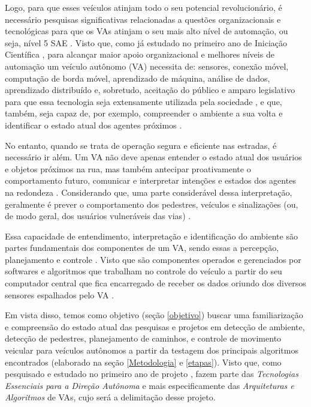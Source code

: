 \documentclass{article}
\begin{document}
Logo, para que esses veículos atinjam todo o seu potencial revolucionário, é necessário pesquisas significativas relacionadas a questões organizacionais e tecnológicas para que os VAs atinjam o seu mais alto nível de automação, ou seja, nível 5 SAE \cite{SAE}. Visto que, como já estudado no primeiro ano de Iniciação Científica \cite{my-work-on-git}, para alcançar maior apoio organizacional e melhores níveis de automação um veículo autônomo (VA) necessita de: sensores, conexão móvel, computação de borda móvel, aprendizado de máquina, análise de dados, aprendizado distribuído e, sobretudo, aceitação do público e amparo legislativo para que essa tecnologia seja extensamente utilizada pela sociedade \cite{KPMG}, e que, também, seja capaz de, por exemplo, compreender o ambiente a sua volta e identificar o estado atual dos agentes próximos \cite{sensors-yet}.

No entanto, quando se trata de operação segura e eficiente nas estradas, é necessário ir além. Um VA não deve apenas entender o estado atual dos usuários e objetos próximos na rua, mas também antecipar proativamente o comportamento futuro, comunicar e interpretar intenções e estados dos agentes na redondeza \cite{conge}. Considerando que, uma parte considerável dessa interpretação, geralmente é prever o comportamento dos pedestres, veículos e sinalizações (ou, de modo geral, dos usuários vulneráveis das vias) \cite{software-review}.

Essa capacidade de entendimento, interpretação e identificação do ambiente são partes fundamentais dos componentes de um VA, sendo essas a percepção, planejamento e controle \cite[p. ~37]{my-work-on-git}. Visto que são componentes operados e gerenciados por softwares e algoritmos que trabalham no controle do veículo a partir do seu computador central que fica encarregado de receber os dados oriundo dos diversos sensores espalhados pelo VA \cite[p. ~39]{my-work-on-git}.

    
    Em vista disso, temos como objetivo (seção \ref{objetivo}) buscar uma familiarização e compreensão do estado atual das pesquisas e projetos em detecção de ambiente, detecção de pedestres, planejamento de caminhos, e controle de movimento veicular para veículos autônomos a partir da testagem dos principais algoritmos encontrados (elaborado na seção \ref{Metodologia} e \ref{etapas}). Visto que, como pesquisado e estudado no primeiro ano de projeto \cite{my-work-on-git}, fazem parte das \textit{Tecnologias Essenciais para a Direção Autônoma} e mais especificamente das \textit{Arquiteturas e Algoritmos} de VAs, cujo será a delimitação desse projeto.
 
\end{document}
